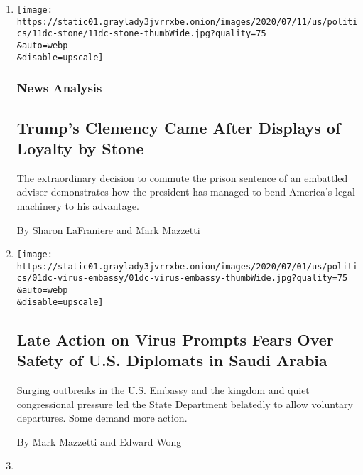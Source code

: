 \begin{enumerate}
\def\labelenumi{\arabic{enumi}.}
\item
  \href{/2020/07/11/us/politics/trump-roger-stone.html}{}

  \texttt{[image: https://static01.graylady3jvrrxbe.onion/images/2020/07/11/us/politics/11dc-stone/11dc-stone-thumbWide.jpg?quality=75\\\&auto=webp\\\&disable=upscale]}

  \hypertarget{news-analysis}{%
  \subsubsection{News Analysis}\label{news-analysis}}

  \hypertarget{trumps-clemency-came-after-displays-of-loyalty-by-stone}{%
  \subsection{Trump's Clemency Came After Displays of Loyalty by
  Stone}\label{trumps-clemency-came-after-displays-of-loyalty-by-stone}}

  The extraordinary decision to commute the prison sentence of an
  embattled adviser demonstrates how the president has managed to bend
  America's legal machinery to his advantage.

  By Sharon LaFraniere and Mark Mazzetti
\item
  \href{/2020/07/01/us/politics/coronavirus-us-embassy-saudi-arabia.html}{}

  \texttt{[image: https://static01.graylady3jvrrxbe.onion/images/2020/07/01/us/politics/01dc-virus-embassy/01dc-virus-embassy-thumbWide.jpg?quality=75\\\&auto=webp\\\&disable=upscale]}

  \hypertarget{late-action-on-virus-prompts-fears-over-safety-of-us-diplomats-in-saudi-arabia}{%
  \subsection{Late Action on Virus Prompts Fears Over Safety of U.S.
  Diplomats in Saudi
  Arabia}\label{late-action-on-virus-prompts-fears-over-safety-of-us-diplomats-in-saudi-arabia}}

  Surging outbreaks in the U.S. Embassy and the kingdom and quiet
  congressional pressure led the State Department belatedly to allow
  voluntary departures. Some demand more action.

  By Mark Mazzetti and Edward Wong
\item
  \href{/2020/06/28/us/politics/michael-flynn-sidney-powell.html}{}


\end{enumerate}
